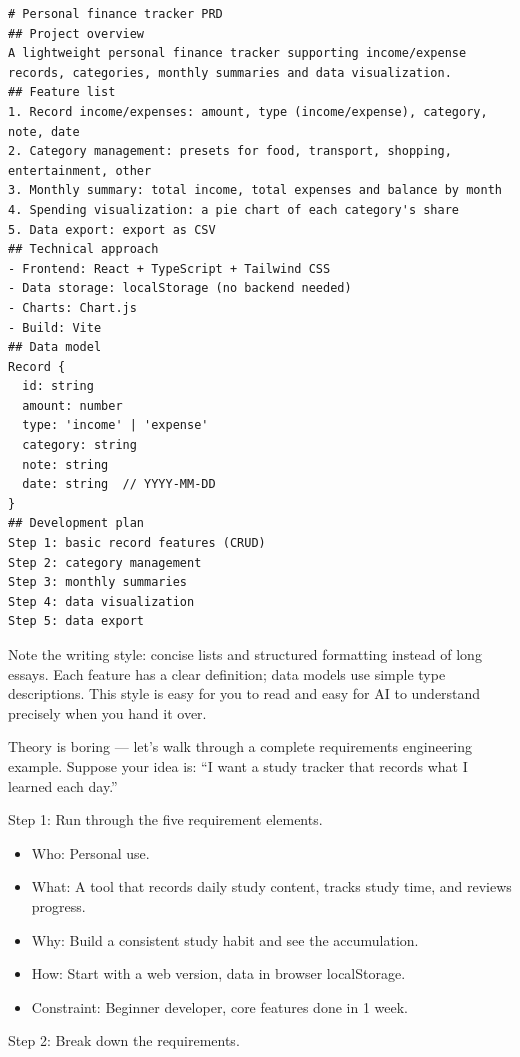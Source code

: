 \begin{lstlisting}
# Personal finance tracker PRD
## Project overview
A lightweight personal finance tracker supporting income/expense records, categories, monthly summaries and data visualization.
## Feature list
1. Record income/expenses: amount, type (income/expense), category, note, date
2. Category management: presets for food, transport, shopping, entertainment, other
3. Monthly summary: total income, total expenses and balance by month
4. Spending visualization: a pie chart of each category's share
5. Data export: export as CSV
## Technical approach
- Frontend: React + TypeScript + Tailwind CSS
- Data storage: localStorage (no backend needed)
- Charts: Chart.js
- Build: Vite
## Data model
Record {
  id: string
  amount: number
  type: 'income' | 'expense'
  category: string
  note: string
  date: string  // YYYY-MM-DD
}
## Development plan
Step 1: basic record features (CRUD)
Step 2: category management
Step 3: monthly summaries
Step 4: data visualization
Step 5: data export
\end{lstlisting}

Note the writing style: concise lists and structured formatting instead of long essays. Each feature has a clear definition; data models use simple type descriptions. This style is easy for you to read and easy for AI to understand precisely when you hand it over.


Theory is boring — let's walk through a complete requirements engineering example. Suppose your idea is: “I want a study tracker that records what I learned each day.”

Step 1: Run through the five requirement elements.

\begin{itemize}
  \item Who: Personal use.
  \item What: A tool that records daily study content, tracks study time, and reviews progress.
  \item Why: Build a consistent study habit and see the accumulation.
  \item How: Start with a web version, data in browser localStorage.
  \item Constraint: Beginner developer, core features done in 1 week.
\end{itemize}

Step 2: Break down the requirements.

